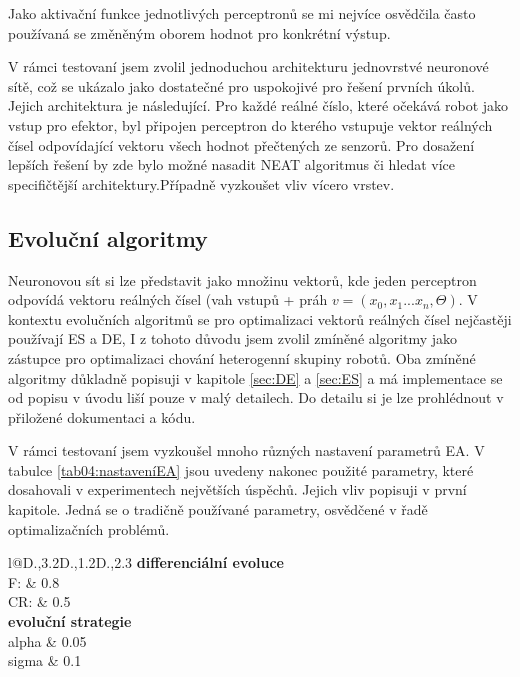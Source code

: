 \par 
Jako aktivační funkce jednotlivých perceptronů se mi nejvíce osvědčila často používaná se změněným oborem hodnot pro konkrétní výstup.
\par
V rámci testovaní jsem zvolil jednoduchou architekturu jednovrstvé neuronové sítě, což se ukázalo jako dostatečné pro uspokojivé pro řešení prvních úkolů. Jejich architektura je následující. Pro každé reálné číslo, které očekává robot jako vstup pro efektor, byl připojen perceptron do kterého vstupuje vektor reálných čísel odpovídající vektoru všech hodnot přečtených ze senzorů.  Pro dosažení lepších řešení by zde bylo možné nasadit NEAT algoritmus či hledat více specifičtější architektury.Případně vyzkoušet vliv vícero vrstev. 
\subsection*{Evoluční algoritmy}
Neuronovou sít si lze představit jako množinu vektorů, kde jeden perceptron odpovídá vektoru reálných čísel (vah vstupů + práh $v =(x_0,x_1...x_n,\Theta)$. V kontextu evolučních algoritmů se pro optimalizaci vektorů reálných čísel nejčastěji používají ES a DE, I z tohoto důvodu jsem zvolil zmíněné algoritmy jako zástupce pro optimalizaci chování heterogenní skupiny robotů. Oba zmíněné algoritmy důkladně popisuji v kapitole \ref{sec:DE} a \ref{sec:ES} a má implementace se od popisu v úvodu liší pouze v malý detailech. Do detailu si je lze prohlédnout v přiložené dokumentaci a kódu. 
\par
V rámci testovaní jsem vyzkoušel mnoho různých nastavení parametrů EA. V tabulce \ref{tab04:nastaveníEA} jsou uvedeny nakonec použité parametry, které dosahovali v experimentech největších úspěchů. Jejich vliv popisuji v první kapitole. Jedná se o tradičně používané parametry, osvědčené v řadě optimalizačních problémů. 
\begin{table}[h]\centering
	\begin{tabular}{l@{\hspace{1.5cm}}D{.}{,}{3.2}D{.}{,}{1.2}D{.}{,}{2.3}}
		\toprule
		 \textbf{differenciální evoluce}\\
		\midrule
		F:     & 0.8 \\
		CR:  & 0.5 \\
		\toprule
		\textbf{evoluční strategie}\\
		\midrule
		alpha & 0.05 \\
		sigma & 0.1\\
		\bottomrule
	\end{tabular}
	\caption{Nastavení parametrů u EA}
	\label{tab04:nastaveníEA}
\end{table}
\newpage

